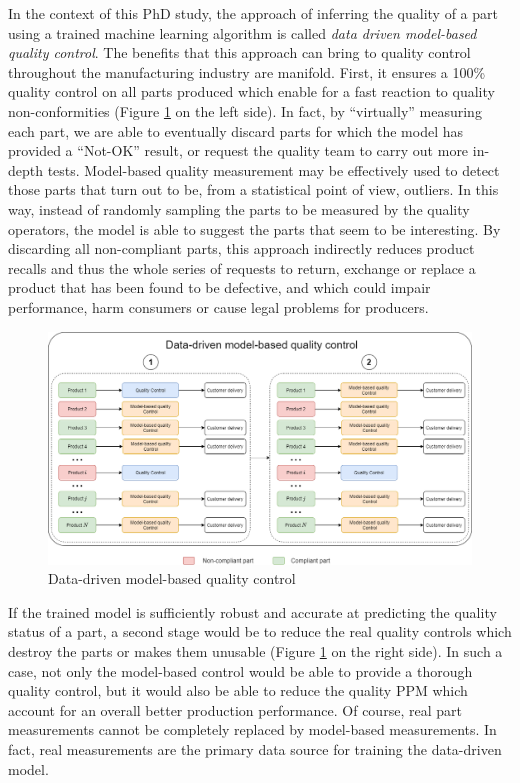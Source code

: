 In the context of this PhD study, the approach of inferring the quality of a part using a trained machine learning algorithm is called \textit{data driven model-based quality control}.
The benefits that this approach can bring to quality control throughout the manufacturing industry are manifold. First, it ensures a 100\% quality control on all parts produced which enable for a fast reaction to quality non-conformities (Figure \ref{fig:model_quality_control} on the left side). In fact, by ``virtually'' measuring each part, we are able to eventually discard parts for which the model has provided a ``Not-OK'' result, or request the quality team to carry out more in-depth tests. Model-based quality measurement may be effectively used to detect those parts that turn out to be, from a statistical point of view, outliers. In this way, instead of randomly sampling the parts to be measured by the quality operators, the model is able to suggest the parts that seem to be interesting.
By discarding all non-compliant parts, this approach indirectly reduces product recalls and thus the whole series of requests to return, exchange or replace a product that has been found to be defective, and which could impair performance, harm consumers or cause legal problems for producers.

\begin{landscape}
\begin{figure}
\centering
\includegraphics[scale=0.50]{images/chapter_4/data_driven_model.png}
\caption{Data-driven model-based quality control}
\label{fig:model_quality_control}
\end{figure}
\end{landscape}

If the trained model is sufficiently robust and accurate at predicting the quality status of a part, a second stage would be to reduce the real quality controls which destroy the parts or makes them unusable (Figure \ref{fig:model_quality_control} on the right side). In such a case, not only the model-based control would be able to provide a thorough quality control, but it would also be able to reduce the quality PPM which account for an overall better production performance. Of course, real part measurements cannot be completely replaced by model-based measurements. In fact, real measurements are the primary data source for training the data-driven model. 

